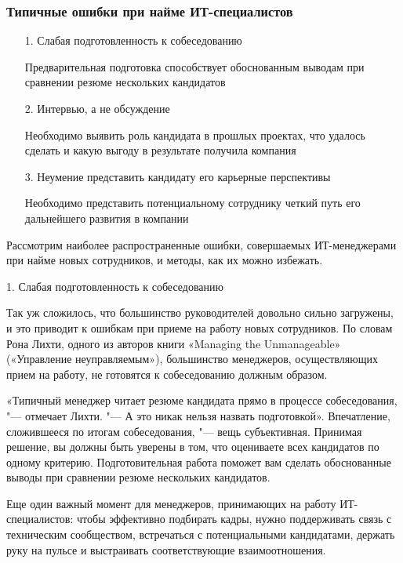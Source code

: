 \documentclass{../industrial-development}
\begin{document}
\begin{frame} \frametitle{Типичные ошибки при найме ИТ-специалистов}
  \begin{itemize}
\item[1.] Слабая подготовленность к собеседованию

{\small Предварительная подготовка способствует обоснованным выводам при сравнении резюме нескольких кандидатов}

\item[2.] Интервью, а не обсуждение

{\small Необходимо выявить роль кандидата в прошлых проектах, что удалось сделать и какую выгоду в результате получила компания}

\item[3.] Неумение представить кандидату его карьерные перспективы

{\small Необходимо представить потенциальному сотруднику четкий путь его дальнейшего развития в компании}


 \end{itemize}



\end{frame}

\lecturenotes

Рассмотрим наиболее распространенные ошибки, совершаемых ИТ-менеджерами при найме новых сотрудников, и методы, как их можно избежать.

1. \alert{Слабая подготовленность к собеседованию}

Так уж сложилось, что большинство руководителей довольно сильно загружены, и это приводит к ошибкам при приеме на работу новых сотрудников. По словам Рона Лихти, одного из авторов книги «Managing the Unmanageable» («Управление неуправляемым»), большинство менеджеров, осуществляющих прием на работу, не готовятся к собеседованию должным образом.

«Типичный менеджер читает резюме кандидата прямо в процессе собеседования, "--- отмечает Лихти. "--- А это никак нельзя назвать подготовкой». Впечатление, сложившееся по итогам собеседования, "--- вещь субъективная. Принимая решение, вы должны быть уверены в том, что оцениваете всех кандидатов по одному критерию. Подготовительная работа поможет вам сделать обоснованные выводы при сравнении резюме нескольких кандидатов.

Еще один важный момент для менеджеров, принимающих на работу ИТ-специалистов: чтобы эффективно подбирать кадры, нужно поддерживать связь с техническим сообществом, встречаться с потенциальными кандидатами, держать руку на пульсе и выстраивать соответствующие взаимоотношения.
\end{document}
